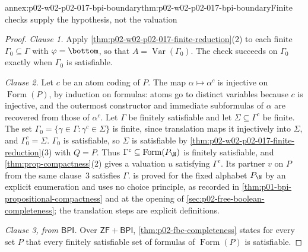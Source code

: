 \begin{annexitem}{annex:p02-w02-p02-017-bpi-boundary}{thm:p02-w02-p02-017-bpi-boundary}{Finite checks supply the hypothesis, not the valuation}
\begin{proof}
\emph{Clause 1.}  Apply
\cref{thm:p02-w02-p02-017-finite-reduction}(2) to each finite
\(\Gamma_0\subseteq\Gamma\) with \(\varphi=\bottom\), so that
\(A=\operatorname{Var}(\Gamma_0)\).  The check succeeds on \(\Gamma_0\)
exactly when \(\Gamma_0\) is satisfiable.

\emph{Clause 2.}  Let \(c\) be an atom coding of \(P\).  The map
\(\alpha\mapsto\alpha^{c}\) is injective on \(\operatorname{Form}(P)\),
by induction on formulas: atoms go to distinct variables because \(c\) is
injective, and the outermost constructor and immediate subformulas of
\(\alpha\) are recovered from those of \(\alpha^{c}\).  Let \(\Gamma\) be
finitely satisfiable and let \(\Sigma\subseteq\Gamma^{c}\) be finite.
The set \(\Gamma_0=\{\gamma\in\Gamma:\gamma^{c}\in\Sigma\}\) is finite,
since translation maps it injectively into \(\Sigma\), and
\(\Gamma_0^{c}=\Sigma\).  \(\Gamma_0\) is satisfiable, so \(\Sigma\) is
satisfiable by \cref{thm:p02-w02-p02-017-finite-reduction}(3) with
\(Q=P\).  Thus \(\Gamma^{c}\subseteq\operatorname{Form}(P_{\N})\) is finitely satisfiable,
and \cref{thm:prop-compactness}(2) gives a valuation \(u\) satisfying
\(\Gamma^{c}\).  Its partner \(v\) on \(P\) from the same clause~3
satisfies \(\Gamma\).   is proved for the
fixed alphabet \(P_{\N}\) by an explicit enumeration and uses no choice
principle, as recorded in \cref{thm:p01-bpi-propositional-compactness}
and at the opening of \cref{sec:p02-free-boolean-completeness}; the
translation steps are explicit definitions.

\emph{Clause 3, from \(\mathsf{BPI}\).}  Over
\(\mathsf{ZF}+\mathsf{BPI}\), \cref{thm:p02-fbc-completeness} states for
every set \(P\) that every finitely satisfiable set of formulas of
\(\operatorname{Form}(P)\) is satisfiable.


\end{proof}
\end{annexitem}
